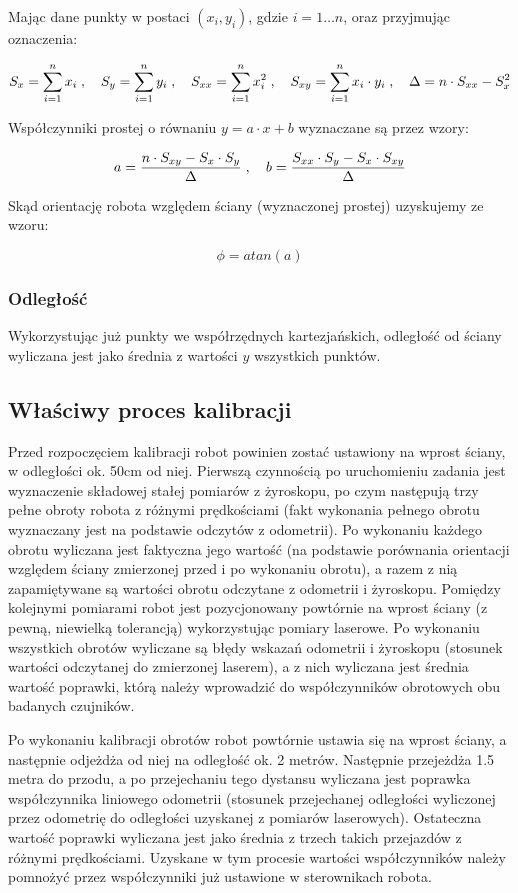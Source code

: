 Mając dane punkty w postaci $(x_i, y_i)$, gdzie $i=1\ldots n$, oraz przyjmując
oznaczenia:

\[
S_x = \sum_{i=1}^n x_i \; , \quad
S_y = \sum_{i=1}^n y_i \; , \quad
S_{xx} = \sum_{i=1}^n x_i^2 \; , \quad
S_{xy} = \sum_{i=1}^n x_i \cdot y_i \; , \quad
\Delta = n \cdot S_{xx} - S_x^2
\]

Współczynniki prostej o równaniu $y=a\cdot x+b$ wyznaczane są przez wzory:

\[
a = \frac{n \cdot S_{xy} - S_x \cdot S_y}{\Delta} \; , \quad
b = \frac{S_{xx} \cdot S_y - S_x \cdot S_{xy}}{\Delta}
\]

Skąd orientację robota względem ściany (wyznaczonej prostej) uzyskujemy ze
wzoru:

\[
\phi=atan(a)
\]

\subsubsection{Odległość}

Wykorzystując już punkty we współrzędnych kartezjańskich, odległość od ściany
wyliczana jest jako średnia z wartości $y$ wszystkich punktów. 

\subsection{Właściwy proces kalibracji}

Przed rozpoczęciem kalibracji robot powinien zostać ustawiony na wprost ściany,
w odległości ok. 50cm od niej. Pierwszą czynnością po uruchomieniu zadania jest
wyznaczenie składowej stałej pomiarów z żyroskopu, po czym następują trzy
pełne obroty robota z różnymi prędkościami (fakt wykonania pełnego obrotu
wyznaczany jest na podstawie odczytów z odometrii). Po wykonaniu każdego obrotu
wyliczana jest faktyczna jego wartość (na podstawie porównania orientacji
względem ściany zmierzonej przed i po wykonaniu obrotu), a razem z nią
zapamiętywane są wartości obrotu odczytane z odometrii i żyroskopu. Pomiędzy
kolejnymi pomiarami robot jest pozycjonowany powtórnie na wprost ściany (z
pewną, niewielką tolerancją) wykorzystując pomiary laserowe. Po wykonaniu
wszystkich obrotów wyliczane są błędy wskazań odometrii i żyroskopu (stosunek
wartości odczytanej do zmierzonej laserem), a z nich wyliczana jest średnia
wartość poprawki, którą należy wprowadzić do współczynników obrotowych obu
badanych czujników.

Po wykonaniu kalibracji obrotów robot powtórnie ustawia się na wprost ściany, a
następnie odjeżdża od niej na odległość ok. 2 metrów. Następnie przejeżdża 1.5
metra do przodu, a po przejechaniu tego dystansu wyliczana jest poprawka
współczynnika liniowego odometrii (stosunek przejechanej odległości wyliczonej
przez odometrię do odległości uzyskanej z pomiarów laserowych). Ostateczna
wartość poprawki wyliczana jest jako średnia z trzech takich przejazdów z
różnymi prędkościami. Uzyskane w tym procesie wartości współczynników należy
pomnożyć przez współczynniki już ustawione w sterownikach robota.




